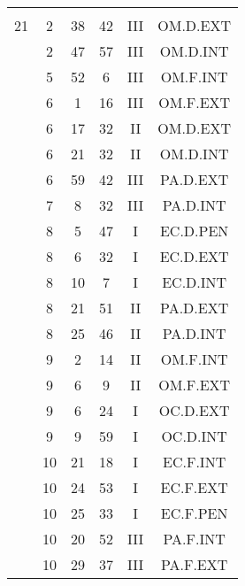 \documentclass[12pt, a4paper]{article}
\begin{document}
\begin{multicols}{3}
{\begin{tabular}{c c c c c c}
	 	 	 	 & & & & & \\%
	 	 	 	21 & 2 & 38 & 42 & III & OM.D.EXT\\%
	 	 	 	 & 2 & 47 & 57 & III & OM.D.INT\\%
	 	 	 	 & 5 & 52 & 6 & III & OM.F.INT\\%
	 	 	 	 & 6 & 1 & 16 & III & OM.F.EXT\\%
	 	 	 	 & 6 & 17 & 32 & II & OM.D.EXT\\%
	 	 	 	 & 6 & 21 & 32 & II & OM.D.INT\\%
	 	 	 	 & 6 & 59 & 42 & III & PA.D.EXT\\%
	 	 	 	 & 7 & 8 & 32 & III & PA.D.INT\\%
	 	 	 	 & 8 & 5 & 47 & I & EC.D.PEN\\%
	 	 	 	 & 8 & 6 & 32 & I & EC.D.EXT\\%
	 	 	 	 & 8 & 10 & 7 & I & EC.D.INT\\%
	 	 	 	 & 8 & 21 & 51 & II & PA.D.EXT\\%
	 	 	 	 & 8 & 25 & 46 & II & PA.D.INT\\%
	 	 	 	 & 9 & 2 & 14 & II & OM.F.INT\\%
	 	 	 	 & 9 & 6 & 9 & II & OM.F.EXT\\%
	 	 	 	 & 9 & 6 & 24 & I & OC.D.EXT\\%
	 	 	 	 & 9 & 9 & 59 & I & OC.D.INT\\%
	 	 	 	 & 10 & 21 & 18 & I & EC.F.INT\\%
	 	 	 	 & 10 & 24 & 53 & I & EC.F.EXT\\%
	 	 	 	 & 10 & 25 & 33 & I & EC.F.PEN\\%
	 	 	 	 & 10 & 20 & 52 & III & PA.F.INT\\%
	 	 	 	 & 10 & 29 & 37 & III & PA.F.EXT\\%

\end{tabular}}
\end{multicols}
\end{document}

